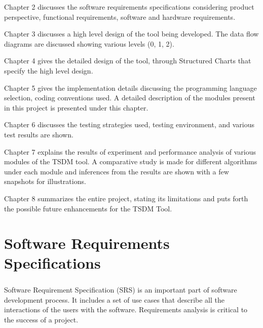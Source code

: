 \documentclass[12pt,a4paper]{report}
\begin{document}
Chapter 2 discusses the software requirements specifications considering product perspective, functional requirements, software and hardware requirements.


Chapter 3 discusses a high level design of the tool being developed. The data flow diagrams are discussed showing various levels (0, 1, 2).

Chapter 4 gives the detailed design of the tool, through Structured Charts that specify the high level design.

Chapter 5 gives the implementation details discussing the programming language selection, coding conventions used. A detailed description of the modules present in this project is presented under this chapter.



Chapter 6 discusses the testing strategies used, testing environment, and various test results are shown.



Chapter 7 explains the results of experiment and performance analysis of various modules of the TSDM tool. A comparative study is made for different algorithms under each module and inferences from the results are shown with a few snapshots for illustrations.



Chapter 8 summarizes the entire project, stating its limitations and puts forth the possible future enhancements for the TSDM Tool.
\pagestyle{fancy}
\chead{}
\rfoot{\small{\thepage}}
\renewcommand{\headrulewidth}{0.4pt}
\renewcommand{\footrulewidth}{0.4pt}

\chapter{Software Requirements Specifications}

\paragraph{}Software Requirement Specification (SRS) is an important part of software development process. It includes a set of use cases that describe all the interactions of the users with the software. Requirements analysis is critical to the success of a project. \\
\end{document}
